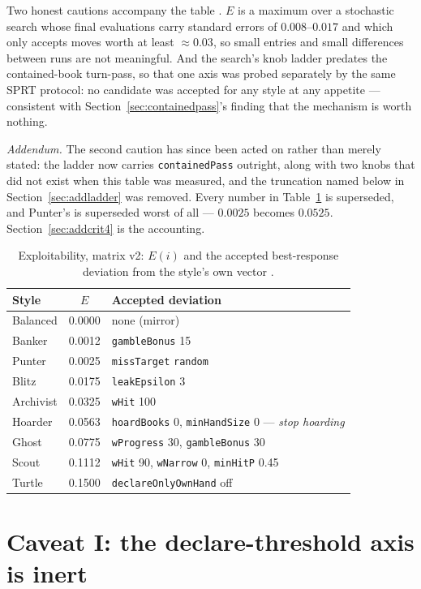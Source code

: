\documentclass[11pt]{article}
\newcommand{\code}[1]{\texttt{#1}}
\begin{document}
Two honest cautions accompany the table \cite{styles}. $E$ is a maximum over a stochastic
search whose final evaluations carry standard errors of $0.008$--$0.017$ and which only
accepts moves worth at least ${\approx}0.03$, so small entries and small differences between
runs are not meaningful. And the search's knob ladder predates the contained-book turn-pass,
so that one axis was probed separately by the same SPRT protocol: no candidate was accepted
for any style at any appetite --- consistent with Section~\ref{sec:containedpass}'s finding
that the mechanism is worth nothing.

\emph{Addendum.} The second caution has since been acted on rather than merely stated: the
ladder now carries \code{containedPass} outright, along with two knobs that did not exist when
this table was measured, and the truncation named below in Section~\ref{sec:addladder} was
removed. Every number in Table~\ref{tab:exploit} is superseded, and Punter's is superseded
worst of all --- $0.0025$ becomes $0.0525$. Section~\ref{sec:addcrit4} is the accounting.

\begin{table}[t]
\centering
\caption{Exploitability, matrix v2: $E(i)$ and the accepted best-response deviation from the
style's own vector \cite{artifact,styles}.}
\label{tab:exploit}
\footnotesize
\begin{tabular}{@{}lcl@{}}
\toprule
Style & $E$ & Accepted deviation \\
\midrule
Balanced  & 0.0000 & none (mirror) \\
Banker    & 0.0012 & \code{gambleBonus} 15 \\
Punter    & 0.0025 & \code{missTarget} \code{random} \\
Blitz     & 0.0175 & \code{leakEpsilon} 3 \\
Archivist & 0.0325 & \code{wHit} 100 \\
Hoarder   & 0.0563 & \code{hoardBooks} 0, \code{minHandSize} 0 --- \emph{stop hoarding} \\
Ghost     & 0.0775 & \code{wProgress} 30, \code{gambleBonus} 30 \\
Scout     & 0.1112 & \code{wHit} 90, \code{wNarrow} 0, \code{minHitP} 0.45 \\
Turtle    & 0.1500 & \code{declareOnlyOwnHand} off \\
\bottomrule
\end{tabular}
\end{table}

\section{Caveat I: the declare-threshold axis is inert}
\label{sec:inert}
\end{document}
